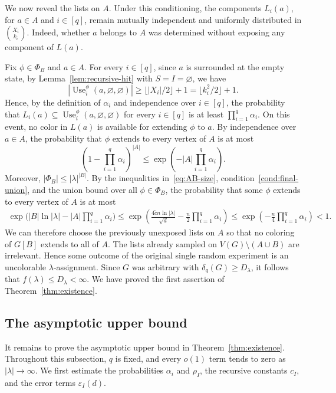 \documentclass[10pt,a4paper]{amsart}
\numberwithin{equation}{section}
\newcommand{\Use}{\operatorname{Use}}
\begin{document}
We now reveal the lists on $A$. Under this conditioning,
the components $L_i(a)$, for $a\in A$ and $i\in[q]$, remain mutually
independent and uniformly distributed in $\binom{X_i}{k_i}$. Indeed, whether
$a$ belongs to $A$ was determined without exposing any component of $L(a)$.

Fix $\phi \in \Phi_B$ and $a \in A$. For every $i \in [q]$, since $a$ is
surrounded at the empty state, by Lemma~\ref{lem:recursive-hit} with
$S = I = \varnothing$, we have
\[
 |\Use_i^\phi(a, \varnothing, \varnothing)|
 \geq \lfloor |X_i|/2\rfloor + 1 = \lfloor k_i^2/2\rfloor + 1.
\]
Hence, by the definition of $\alpha_i$ and independence over $i \in [q]$,
the probability that
$L_i(a) \subseteq \Use_i^\phi(a, \varnothing, \varnothing)$ for every
$i \in [q]$ is at least $\prod_{i = 1}^q \alpha_i$.
On this event, no color in $L(a)$ is available for extending $\phi$ to $a$.
By independence over $a \in A$, the probability that $\phi$ extends to every
vertex of $A$ is at most
\[
 \left(1 - \prod_{i = 1}^q \alpha_i\right)^{|A|}
 \leq \exp\left(-|A|\prod_{i = 1}^q \alpha_i\right).
\]
Moreover, $|\Phi_B| \leq |\lambda|^{|B|}$. By the inequalities
in~\eqref{eq:AB-size}, condition~\ref{cond:final-union}, and the union bound over all
$\phi \in \Phi_B$, the probability that some $\phi$ extends to every vertex of
$A$ is at most
\begin{align*}
 \exp\bigl(|B|\ln |\lambda|
           -|A|\prod_{i = 1}^q \alpha_i\bigr) \leq
 \exp\left(
 \frac{4\widetilde{c}n\ln |\lambda|}{\sqrt{d}}
 -\frac{n}{2}\prod_{i = 1}^q \alpha_i\right)
  \leq \exp\left(-\frac{n}{4}\prod_{i = 1}^q \alpha_i\right) < 1.
\end{align*}
We can therefore choose the previously unexposed lists on $A$ so that no
coloring of $G[B]$ extends to all of $A$. The lists already sampled on
$V(G) \setminus (A \cup B)$ are irrelevant. Hence some outcome of the original
single random experiment is an uncolorable $\lambda$-assignment. Since $G$
was arbitrary with $\delta_q(G)\geq D_\lambda$, it follows that
$f(\lambda)\leq D_\lambda<\infty$. We have proved the first assertion of
Theorem~\ref{thm:existence}.

\subsection{The asymptotic upper bound}
\label{subsec:threshold}

It remains to prove the asymptotic upper bound in
Theorem~\ref{thm:existence}. Throughout this subsection, $q$ is fixed, and
every $o(1)$ term tends to zero as $|\lambda|\to\infty$. We first estimate
the probabilities $\alpha_i$ and $\rho_I$, the recursive
constants $c_I$, and the error terms $\varepsilon_I(d)$.
\end{document}
